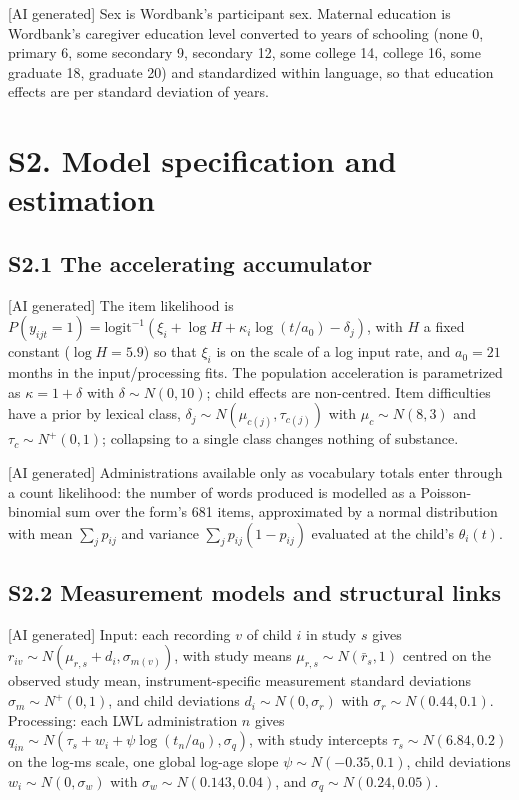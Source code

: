[AI generated] Sex is Wordbank's participant sex. Maternal education is Wordbank's
caregiver education level converted to years of schooling (none 0, primary 6,
some secondary 9, secondary 12, some college 14, college 16, some graduate 18,
graduate 20) and standardized within language, so that education effects are per
standard deviation of years.

\section*{S2. Model specification and estimation}

\subsection*{S2.1 The accelerating accumulator}

[AI generated] The item likelihood is $P(y_{ijt} = 1) = \mathrm{logit}^{-1}\!\left(
\xi_i + \log H + \kappa_i \log(t / a_0) - \delta_j\right)$, with $H$ a fixed
constant ($\log H = 5.9$) so that $\xi_i$ is on the scale of a log input rate, and
$a_0 = 21$ months in the input/processing fits. The population acceleration is
parametrized as $\kappa = 1 + \delta$ with $\delta \sim N(0, 10)$; child effects
are non-centred. Item difficulties have a prior by lexical class, $\delta_j \sim
N(\mu_{c(j)}, \tau_{c(j)})$ with $\mu_c \sim N(8, 3)$ and $\tau_c \sim
N^+(0, 1)$; collapsing to a single class changes nothing of substance.

[AI generated] Administrations available only as vocabulary totals enter through
a count likelihood: the number of words produced is modelled as a Poisson-binomial
sum over the form's 681 items, approximated by a normal distribution with mean
$\sum_j p_{ij}$ and variance $\sum_j p_{ij}(1 - p_{ij})$ evaluated at the child's
$\theta_i(t)$.

\subsection*{S2.2 Measurement models and structural links}

[AI generated] Input: each recording $v$ of child $i$ in study $s$ gives $r_{iv}
\sim N(\mu_{r,s} + d_i, \sigma_{m(v)})$, with study means $\mu_{r,s} \sim
N(\bar r_s, 1)$ centred on the observed study mean, instrument-specific measurement
standard deviations $\sigma_m \sim N^+(0, 1)$, and child deviations $d_i \sim N(0,
\sigma_r)$ with $\sigma_r \sim N(0.44, 0.1)$. Processing: each LWL administration
$n$ gives $q_{in} \sim N(\tau_s + w_i + \psi \log(t_n / a_0), \sigma_q)$, with
study intercepts $\tau_s \sim N(6.84, 0.2)$ on the log-ms scale, one global
log-age slope $\psi \sim N(-0.35, 0.1)$, child deviations $w_i \sim N(0,
\sigma_w)$ with $\sigma_w \sim N(0.143, 0.04)$, and $\sigma_q \sim N(0.24,
0.05)$.

